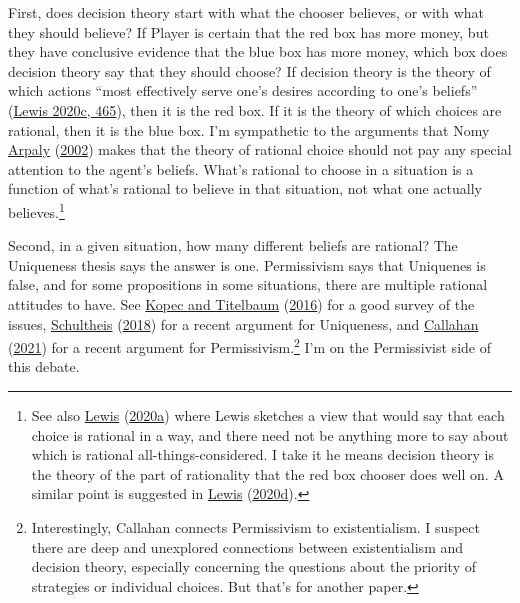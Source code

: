 \documentclass[
  12pt,
]{article}
\begin{document}
First, does decision theory start with what the chooser believes, or
with what they should believe? If Player is certain that the red box has
more money, but they have conclusive evidence that the blue box has more
money, which box does decision theory say that they should choose? If
decision theory is the theory of which actions ``most effectively serve
one's desires according to one's beliefs''
(\protect\hyperlink{ref-Lewis-Price-17051988}{Lewis 2020c, 465}), then
it is the red box. If it is the theory of which choices are rational,
then it is the blue box. I'm sympathetic to the arguments that Nomy
\protect\hyperlink{ref-Arpaly2002}{Arpaly}
(\protect\hyperlink{ref-Arpaly2002}{2002}) makes that the theory of
rational choice should not pay any special attention to the agent's
beliefs. What's rational to choose in a situation is a function of
what's rational to believe in that situation, not what one actually
believes.\footnote{See also
  \protect\hyperlink{ref-Lewis-Mellor-14101981}{Lewis}
  (\protect\hyperlink{ref-Lewis-Mellor-14101981}{2020a}) where Lewis
  sketches a view that would say that each choice is rational in a way,
  and there need not be anything more to say about which is rational
  all-things-considered. I take it he means decision theory is the
  theory of the part of rationality that the red box chooser does well
  on. A similar point is suggested in
  \protect\hyperlink{ref-Lewis-Talbott-22061984}{Lewis}
  (\protect\hyperlink{ref-Lewis-Talbott-22061984}{2020d}).}

Second, in a given situation, how many different beliefs are rational?
The Uniqueness thesis says the answer is one. Permissivism says that
Uniquenes is false, and for some propositions in some situations, there
are multiple rational attitudes to have. See
\protect\hyperlink{ref-KopecTitelbaum2016}{Kopec and Titelbaum}
(\protect\hyperlink{ref-KopecTitelbaum2016}{2016}) for a good survey of
the issues, \protect\hyperlink{ref-Schultheis2018}{Schultheis}
(\protect\hyperlink{ref-Schultheis2018}{2018}) for a recent argument for
Uniqueness, and \protect\hyperlink{ref-Callahan2021}{Callahan}
(\protect\hyperlink{ref-Callahan2021}{2021}) for a recent argument for
Permissivism.\footnote{Interestingly, Callahan connects Permissivism to
  existentialism. I suspect there are deep and unexplored connections
  between existentialism and decision theory, especially concerning the
  questions about the priority of strategies or individual choices. But
  that's for another paper.} I'm on the Permissivist side of this
debate.
\end{document}
